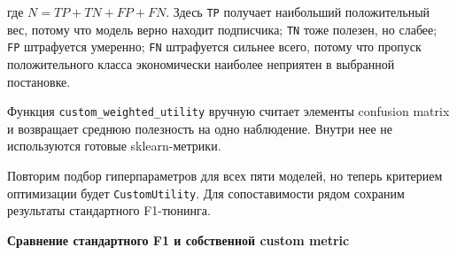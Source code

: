 \documentclass[11pt]{article}
\begin{document}
где \(N = TP + TN + FP + FN\). Здесь \texttt{TP} получает наибольший
положительный вес, потому что модель верно находит подписчика;
\texttt{TN} тоже полезен, но слабее; \texttt{FP} штрафуется умеренно;
\texttt{FN} штрафуется сильнее всего, потому что пропуск положительного
класса экономически наиболее неприятен в выбранной постановке.

    Функция \texttt{custom\_weighted\_utility} вручную считает элементы
confusion matrix и возвращает среднюю полезность на одно наблюдение.
Внутри нее не используются готовые sklearn-метрики.

    Повторим подбор гиперпараметров для всех пяти моделей, но теперь
критерием оптимизации будет \texttt{CustomUtility}. Для сопоставимости
рядом сохраним результаты стандартного F1-тюнинга.

    \textbf{Сравнение стандартного F1 и собственной custom metric}
\end{document}
